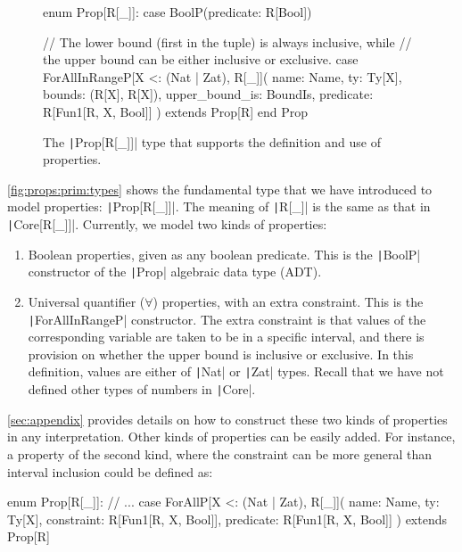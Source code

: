 \documentclass[11pt]{article}
\renewcommand{\vref}[1]{\autoref{#1} \vpageref{#1}}{}
\newcommand{\ScalaI}[1]{\texttt|#1|}
\begin{document}
\begin{figure}[tb]
\begin{ScalaBlock}
enum Prop[R[_]]:
  case BoolP(predicate: R[Bool])
  
  // The lower bound (first in the tuple) is always inclusive, while
  // the upper bound can be either inclusive or exclusive.
  case ForAllInRangeP[X <: (Nat | Zat), R[_]](
    name: Name,
    ty: Ty[X],
    bounds: (R[X], R[X]),
    upper_bound_is: BoundIs,
    predicate: R[Fun1[R, X, Bool]]
  ) extends Prop[R]
end Prop
\end{ScalaBlock}
\caption{The \ScalaI{Prop[R[_]]} type that supports the definition and use of 
properties.}
\label{fig:props:prim:types}
\hrulefill
\end{figure}

\vref{fig:props:prim:types} shows the fundamental type that we have 
introduced to model properties: \ScalaI{Prop[R[_]]}. The meaning of 
\ScalaI{R[_]} is the same as that in \ScalaI{Core[R[_]]}. Currently, we model 
two kinds of properties:

\begin{enumerate}
  \item Boolean properties, given as any boolean predicate. This is the 
  \ScalaI{BoolP} constructor of the \ScalaI{Prop} algebraic data type (ADT).
  
  \item Universal quantifier ($\forall$) properties, with an extra 
  constraint. This is the \ScalaI{ForAllInRangeP} constructor. The extra 
  constraint is that values of the corresponding variable are taken to be in 
  a specific interval, and there is provision on whether the upper bound is 
  inclusive or exclusive. In this definition, values are either of 
  \ScalaI{Nat} or \ScalaI{Zat} types. Recall that we have not defined other 
  types of numbers in \ScalaI{Core}.
\end{enumerate}

\autoref{sec:appendix} provides details on how to construct these two kinds 
of properties in any interpretation. Other kinds of properties can be easily 
added. For instance, a property of the second kind, where the constraint can 
be more general than interval inclusion could be defined as:

\begin{ScalaBlockSimple}
enum Prop[R[_]]:
  // ...
  case ForAllP[X <: (Nat | Zat), R[_]](
    name: Name,
    ty: Ty[X],
    constraint: R[Fun1[R, X, Bool]], 
    predicate: R[Fun1[R, X, Bool]]
  ) extends Prop[R]
\end{ScalaBlockSimple}
\end{document}
